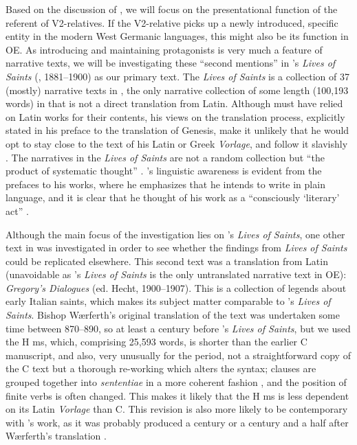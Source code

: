 \documentclass[output=paper,colorlinks,citecolor=brown]{langscibook}
\begin{document}
Based on the discussion of , we will focus on the presentational function of the referent of V2-relatives. If the V2-relative picks up a newly introduced, specific entity in the modern West Germanic languages, this might also be its function in OE. As introducing and maintaining protagonists is very much a feature of narrative texts, we will be investigating these “second mentions” in 's \textit{Lives of Saints} (\citealt{Skeat1966}, 1881--1900) as our primary text. The \textit{Lives of Saints} is a collection of 37 (mostly) narrative texts in , the only narrative collection of some length (100,193 words) in  that is not a direct translation from Latin. Although  must have relied on Latin works for their contents, his views on the translation process, explicitly stated in his preface to the translation of Genesis, make it unlikely that he would opt to stay close to the text of his Latin or Greek \textit{Vorlage}, and follow it slavishly \citep[77--78]{Koopman1992}. The narratives in the \textit{Lives of Saints} are not a random collection but “the product of systematic thought” \citep[43]{Hurst1972}. 's linguistic awareness is evident from the prefaces to his works, where he emphasizes that he intends to write in plain language, and it is clear that he thought of his work as a “consciously ‘literary' act” \citep[182]{Clemoes1956}. 

Although the main focus of the investigation lies on 's \textit{Lives of Saints}, one other text in  was investigated in order to see whether the findings from \textit{Lives of Saints} could be replicated elsewhere. This second text was a translation from Latin (unavoidable as 's \textit{Lives of Saints} is the only untranslated narrative text in OE): \textit{Gregory's Dialogues} (ed. Hecht, 1900--1907). This is a collection of legends about early Italian saints, which makes its subject matter comparable to 's \textit{Lives of Saints}. Bishop Wærferth's original translation of the text was undertaken some time between 870–890, so at least a century before 's \textit{Lives of Saints}, but we used the H ms, which, comprising 25,593 words, is shorter than the earlier C manuscript, and also, very unusually for the period, not a straightforward copy of the C text but a thorough re-working which alters the syntax; clauses are grouped together into \textit{sententiae} in a more coherent fashion \citep{Yerkes1982}, and the position of finite verbs is often changed. This makes it likely that the H ms is less dependent on its Latin \textit{Vorlage} than C. This revision is also more likely to be contemporary with 's work, as it was probably produced a century or a century and a half after Wærferth's translation \citep[9--12]{Yerkes1982}. 
\end{document}
